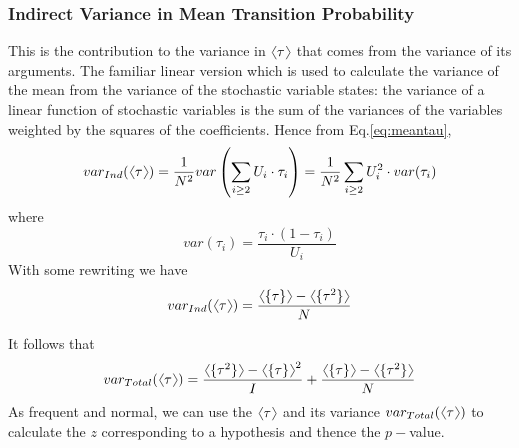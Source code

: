 \documentclass[12pt]{report}
\newcommand{\bdm}{\begin{displaymath}} %
\newcommand{\edm}{\end{displaymath}} %
\newcommand{\langl}{\begin{picture}(4.5,7)
\put(1.1,2.5){\rotatebox{60}{\line(1,0){5.5}}}
\put(1.1,2.5){\rotatebox{300}{\line(1,0){5.5}}}
\end{picture}}
\newcommand{\rangl}{\begin{picture}(4.5,7)
\put(.9,2.5){\rotatebox{120}{\line(1,0){5.5}}}
\put(.9,2.5){\rotatebox{240}{\line(1,0){5.5}}}
\end{picture}}
\newcommand{\mymean}[1]{\ensuremath{\langl{#1}\rangl}} %
\newcommand{\histtau}{\{\tau\}}
\begin{document}
\subsubsection{Indirect Variance in Mean Transition Probability}
This is the contribution to the variance in \mymean{\tau} that comes
from the variance of its arguments. The familiar linear version which
is used to calculate the variance of the mean from the variance of the
stochastic variable states: the variance of a linear function of
stochastic variables is the sum of the variances of the variables
weighted by the squares of the coefficients. Hence from
Eq.\ref{eq:meantau},
\bdm
  var_{Ind}(\mymean{\tau}) = \frac{1}{N^2}var\left(\sum_{i\ge 2}U_i\cdot \tau_i\right) 
= \frac{1}{N^2}\sum_{i\ge 2}U_i^2\cdot var(\tau_i) 
\edm
where
\bdm
var(\tau_i) = \frac{\tau_i\cdot(1-\tau_i)}{U_i}
\edm
With some rewriting we have
\bdm
  var_{Ind}(\mymean{\tau}) = \frac{\mymean{\histtau}-\mymean{\{\tau^2\}}}{N}
\edm

It follows that
\bdm
var_{Total}(\mymean{\tau}) =
\frac{\mymean{\{\tau^2\}} - \mymean{\histtau}^2}{I} +
\frac{\mymean{\histtau}-\mymean{\{\tau^2\}}}{N}
\edm
As frequent and normal, we can use the \mymean{\tau} and its variance
\(var_{Total}(\mymean{\tau})\) to calculate the \(z\) corresponding to
a hypothesis and thence the \(p-\)value.
\end{document}

